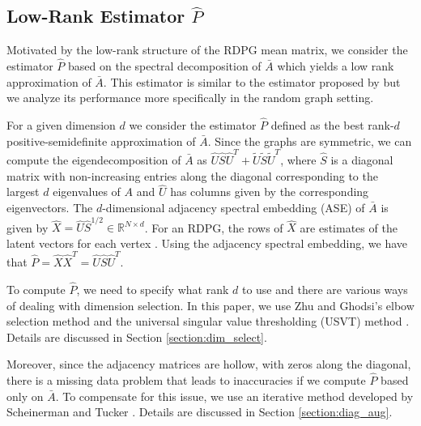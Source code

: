 \documentclass[10pt,letterpaper]{article}
\begin{document}
\subsection{Low-Rank Estimator $\hat{P}$}
\label{sec:phat}

Motivated by the low-rank structure of the RDPG mean matrix, we consider the estimator $\hat{P}$ based on the spectral decomposition of $\bar{A}$ which yields a low rank approximation of $\bar{A}$.
This estimator is similar to the estimator proposed by \citet{chatterjee2015matrix} but we analyze its performance more specifically in the random graph setting.

For a given dimension $d$ we consider the estimator $\hat{P}$ defined as the best rank-$d$ positive-semidefinite approximation of $\bar{A}$.
Since the graphs are symmetric, we can compute the eigendecomposition of $\bar{A}$ as $\hat{U} \hat{S} \hat{U}^T + \tilde{U}\tilde{S}\tilde{U}^T$, where $\hat{S}$ is a diagonal matrix with non-increasing entries along the diagonal corresponding to the largest $d$ eigenvalues of $A$ and $\hat{U}$ has columns given by the corresponding eigenvectors.
The $d$-dimensional adjacency spectral embedding (ASE) of $\bar{A}$ is given by $\hat{X}=\hat{U} \hat{S}^{1/2}\in \mathbb{R}^{N \times d}$.
For an RDPG, the rows of $\hat{X}$ are estimates of the latent vectors for each vertex \citep{sussman2014consistent}.
Using the adjacency spectral embedding, we have that $\hat{P} = \hat{X} \hat{X}^T=\hat{U}\hat{S}\hat{U}^T$.

To compute $\hat{P}$, we need to specify what rank $d$ to use and there are various ways of dealing with dimension selection. 
In this paper, we use Zhu and Ghodsi's elbow selection method \cite{zhu2006automatic} and the universal singular value thresholding (USVT) method \cite{chatterjee2015matrix}. 
Details are discussed in Section \ref{section:dim_select}.

Moreover, since the adjacency matrices are hollow, with zeros along the diagonal, there is a missing data problem that leads to inaccuracies if we compute $\hat{P}$ based only on $\bar{A}$. 
To compensate for this issue, we use an iterative method developed by Scheinerman and Tucker \cite{scheinerman2010modeling}. 
Details are discussed in Section \ref{section:diag_aug}.
\end{document}
